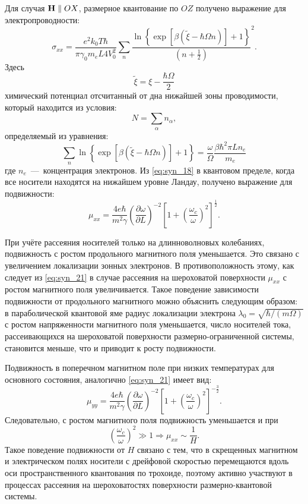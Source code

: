 Для случая $\boldsymbol{\mathbf{H}} \parallel OX$, размерное квантование по $OZ$ получено выражение для электропроводности:
\begin{equation} \label{eq:syn_18}
\sigma_{xx} = \frac{e^2 k_0 T \hbar}{\pi \gamma_0 m_e L 4 V^2_0} \sum_n{\frac{\ln{\left\{\exp{\left[\beta \left(\widetilde{\xi}-\hbar \Omega n\right)\right]}+1\right\}}}{\left(n+\frac{1}{2}\right)}^2}. 
\end{equation}
Здесь
\[
\widetilde{\xi} = \xi -\frac{\hbar\Omega }{2}
\]
химический потенциал отсчитанный от дна нижайшей зоны проводимости, который находится из условия:
\begin{equation} \label{eq:syn_19}
N=\sum_{\alpha }{n_{\alpha}},
\end{equation}
определяемый из уравнения:
\begin{equation} \label{eq:syn_20}
\sum_n{\ln{\left\{\exp{\left[\beta \left(\widetilde{\xi}-\hbar \Omega n\right)\right]}+1\right\}}}=\frac{\omega }{\Omega } \frac{\beta \hbar^2 \pi L n_e}{m_e}
\end{equation}
где $n_e$~---~концентрация электронов.
Из \eqref{eq:syn_18} в квантовом пределе, когда все носители находятся на нижайшем уровне Ландау, получено выражение для подвижности:
\begin{equation} \label{eq:syn_21}
\mu _{xx} =\frac{4e\hbar }{m^2 \gamma } \left(\frac{\partial \omega }{\partial L} \right)^{-2} \left[1+\left(\frac{\omega_c}{\omega } \right)^2 \right]^{\frac{1}{2} }.
\end{equation}

При учёте рассеяния носителей только на длинноволновых колебаниях, подвижность с ростом продольного магнитного поля уменьшается. Это связано с увеличением локализации зонных электронов. В противоположность этому, как следует из \eqref{eq:syn_21} в случае рассеяния на шероховатой поверхности $\mu_{xx} $ с ростом магнитного поля увеличивается. Такое поведение зависимости подвижности от продольного магнитного можно объяснить следующим образом: в параболической квантовой яме радиус локализации электрона $\lambda_0 =\sqrt{\hbar / (m\Omega) } $ с ростом напряженности магнитного поля уменьшается, число носителей тока, рассеивающихся на шероховатой поверхности размерно-ограниченной системы, становится меньше, что и приводит к росту подвижности.

Подвижность в поперечном магнитном поле при низких температурах для основного состояния, аналогично \eqref{eq:syn_21} имеет вид:
\begin{equation} \label{eq:syn_22}
\mu_{yy} =\frac{4e\hbar }{m^{2} \gamma } \left(\frac{\partial \omega }{\partial L} \right)^{-2} \left[1+\left(\frac{\omega _{c} }{\omega } \right)^{2} \right]^{-\frac{3}{2} }.
\end{equation}
Следовательно, с ростом магнитного поля подвижность уменьшается и при
\[
\left(\frac{\omega_c}{\omega } \right)^2 \gg 1 \Rightarrow \mu_{xx} \sim \frac{1}{H} .
\]
Такое поведение подвижности от $H$ связано с тем, что в скрещенных магнитном и электрическом полях носители с дрейфовой скоростью перемещаются вдоль оси пространственного квантования по трохоиде, поэтому активно участвуют в процессах рассеяния на шероховатостях поверхности размерно-квантовой системы. 


